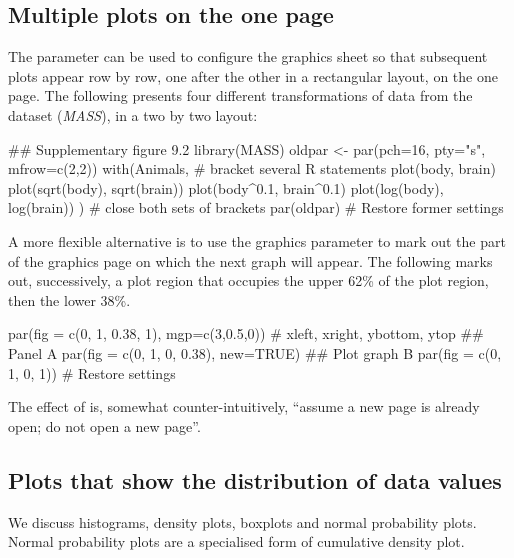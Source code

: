\subsection{Multiple plots on the one page}\label{ss:xplots}
The parameter  can be used to configure the graphics
sheet so that subsequent plots appear row by row, one after the
other in a rectangular layout, on the one page. The following
presents four different transformations of data from the dataset
 ({\em MASS}),
in a two by two layout:
\begin{Schunk}
\begin{Sinput}
## Supplementary figure 9.2
library(MASS)
oldpar <- par(pch=16, pty="s", mfrow=c(2,2))
with(Animals, {      # bracket several R statements
  plot(body, brain)
  plot(sqrt(body), sqrt(brain))
  plot(body^0.1, brain^0.1)
  plot(log(body), log(brain))
})                   # close both sets of brackets
par(oldpar)          # Restore former settings
\end{Sinput}
\end{Schunk}

A more flexible alternative is to use the graphics parameter
 to mark out the part of the graphics page on which the
next graph will appear.  The following marks out, successively,
a plot region that occupies the upper 62\% of the plot region,
then the lower 38\%.
\begin{Schunk}
\begin{Sinput}
par(fig = c(0, 1, 0.38, 1), mgp=c(3,0.5,0))
          # xleft, xright, ybottom, ytop
## Panel A
par(fig = c(0, 1, 0, 0.38), new=TRUE)
## Plot graph B
par(fig = c(0, 1, 0, 1))    # Restore settings
\end{Sinput}
\end{Schunk}
The effect of  is, somewhat
counter-intuitively, ``assume a new page is already open; do not open
a new page''.

\subsection{Plots that show the distribution of data values}
  We discuss
histograms, density plots, boxplots and normal probability plots.
Normal probability plots are a specialised form of cumulative
density plot.

